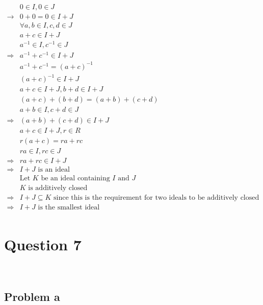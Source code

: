 \documentclass{article}
\begin{document}
\begin{align*}
    &0\in I,0\in J\\
    \rightarrow&0+0=0\in I+J\\
    &\forall a,b\in I,c,d\in J\\
    &a+c\in I+J\\
    &a^{-1}\in I,c^{-1}\in J\\
    \Rightarrow&a^{-1}+c^{-1}\in I+J\\
    &a^{-1}+c^{-1}=(a+c)^{-1}\\
    &(a+c)^{-1}\in I+J\\
    &a+c\in I+J,b+d\in I+J\\
    &(a+c)+(b+d)=(a+b)+(c+d)\\
    &a+b\in I,c+d\in J\\
    \Rightarrow&(a+b)+(c+d)\in I+J\\
    &a+c\in I+J,r\in R\\
    &r(a+c)=ra+rc\\
    &ra\in I,rc\in J\\
    \Rightarrow&ra+rc\in I+J\\
    \Rightarrow&I+J\text{ is an ideal}\\
    &\text{Let }K\text{ be an ideal containing }I\text{ and }J\\
    &K\text{ is additively closed}\\
    \Rightarrow&I+J\subseteq K\text{ since this is the requirement for two ideals to be additively closed}\\
    \Rightarrow&I+J\text{ is the smallest ideal}\\
\end{align*}

\newpage

\section*{Question 7}

~

\subsection*{Problem a}

~
\end{document}
